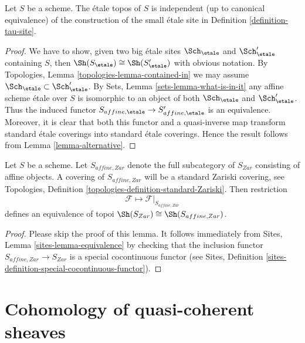 \begin{lemma}
\label{lemma-etale-topos-independent-partial-universe}
Let $S$ be a scheme. The \'etale topos of $S$ is independent
(up to canonical equivalence) of the construction of the small
\'etale site in Definition \ref{definition-tau-site}.
\end{lemma}

\begin{proof}
We have to show, given two big \'etale sites
$\Sch_\etale$ and $\Sch_\etale'$ containing
$S$, then $\Sh(S_\etale) \cong \Sh(S_\etale')$
with obvious notation. By Topologies, Lemma \ref{topologies-lemma-contained-in}
we may assume $\Sch_\etale \subset \Sch_\etale'$.
By Sets, Lemma \ref{sets-lemma-what-is-in-it}
any affine scheme \'etale over $S$ is isomorphic to an object
of both $\Sch_\etale$ and $\Sch_\etale'$.
Thus the induced functor
$S_{affine, \etale} \to S_{affine, \etale}'$
is an equivalence. Moreover, it is clear that both this functor
and a quasi-inverse map transform standard \'etale coverings into
standard \'etale coverings.
Hence the result follows from Lemma \ref{lemma-alternative}.
\end{proof}

\begin{lemma}
\label{lemma-alternative-zariski}
Let $S$ be a scheme. Let $S_{affine, Zar}$ denote the
full subcategory of $S_{Zar}$ consisting of affine objects.
A covering of $S_{affine, Zar}$ will be a standard
Zariski covering, see
Topologies, Definition \ref{topologies-definition-standard-Zariski}.
Then restriction
$$
\mathcal{F} \longmapsto \mathcal{F}|_{S_{affine, Zar}}
$$
defines an equivalence of topoi
$\Sh(S_{Zar}) \cong \Sh(S_{affine, Zar})$.
\end{lemma}

\begin{proof}
Please skip the proof of this lemma. It follows immediately from
Sites, Lemma \ref{sites-lemma-equivalence} by checking that the
inclusion functor $S_{affine, Zar} \to S_{Zar}$
is a special cocontinuous functor (see
Sites, Definition \ref{sites-definition-special-cocontinuous-functor}).
\end{proof}





\section{Cohomology of quasi-coherent sheaves}
\label{section-cohomology-quasi-coherent}

